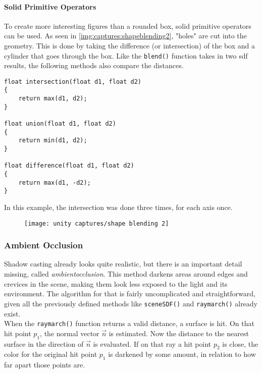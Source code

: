 \clearpage
\paragraph{Solid Primitive Operators}
To create more interesting figures than a rounded box, solid primitive operators can be used. As seen in \autoref{img:captures:shapeblending2}, "holes" are cut into the geometry. This is done by taking the difference (or intersection) of the box and a cylinder that goes through the box.
Like the \lstinline[language=HLSL]{blend()} function takes in two \gls{sdf} results, the following methods also compare the distances.

\begin{lstlisting}[language=HLSL, caption=Implementation of solid primitive operations., label=lst:shader:shapeblending:primitiveoperations]
float intersection(float d1, float d2)
{
    return max(d1, d2);
}

float union(float d1, float d2)
{
    return min(d1, d2);
}

float difference(float d1, float d2)
{
    return max(d1, -d2);
}
\end{lstlisting}

\noindent
In this example, the intersection was done three times, for each axis once.

\begin{figure}[H]
    \texttt{[image: unity captures/shape blending 2]}
    \label{img:captures:shapeblending2}
\end{figure}

\clearpage
\subsubsection{Ambient Occlusion}
Shadow casting already looks quite realistic, but there is an important detail missing, called \textit{\gls{ambientocclusion}}. This method darkens areas around edges and crevices in the scene, making them look less exposed to the light and its environment.
The algorithm for that is fairly uncomplicated and straightforward, given all the previously defined methods like \lstinline[language=HLSL]{sceneSDF()} and \lstinline[language=HLSL]{raymarch()} already exist.
\\
When the \lstinline[language=HLSL]{raymarch()} function returns a valid distance, a surface is hit. On that hit point $p_1$, the normal vector $\overrightarrow{n}$ is estimated. Now the distance to the nearest surface in the direction of $\overrightarrow{n}$ is evaluated.
If on that ray a hit point $p_2$ is close, the color for the original hit point $p_1$ is darkened by some amount, in relation to how far apart those points are.

